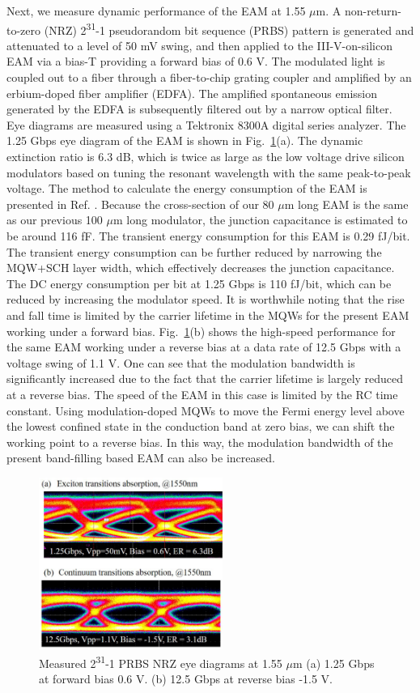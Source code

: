 \documentclass[aip,apl,preprint,a4paper]{revtex4-1}
\def\SP#1{\textsuperscript{#1}}
\begin{document}
Next, we measure dynamic performance of the EAM at 1.55 $\mu$m. A non-return-to-zero (NRZ)  2\SP{31}-1 pseudorandom bit sequence (PRBS) pattern is generated and  attenuated  to  a  level  of  50 mV  swing,  and then  applied  to  the III-V-on-silicon EAM via a bias-T providing a forward bias of 0.6 V. The modulated light is coupled out to a fiber through a fiber-to-chip grating coupler and amplified by an erbium-doped fiber amplifier (EDFA). The amplified spontaneous emission generated by the EDFA is subsequently filtered out by a narrow optical filter. Eye diagrams are measured using a Tektronix 8300A digital series analyzer. The 1.25 Gbps eye diagram of the EAM is shown in Fig.~\ref{fig:6}(a). The dynamic extinction ratio is 6.3 dB, which is twice as large as the low voltage drive silicon modulators based on tuning the resonant wavelength with the same peak-to-peak voltage.\cite{Shakoor:14} The method to calculate the energy consumption of the EAM is presented in Ref. . Because the cross-section of our 80 $\mu$m long EAM is the same as our previous 100 $\mu$m long modulator,\cite{fu52015} the junction capacitance is estimated to be around 116 fF. The transient energy consumption for this EAM is 0.29 fJ/bit. The transient energy consumption can be further reduced by narrowing the MQW+SCH layer width, which effectively decreases the junction capacitance. The DC energy consumption per bit at 1.25 Gbps is 110 fJ/bit, which can be reduced by increasing the modulator speed. It is worthwhile noting that the rise and fall time is limited by the carrier lifetime in the MQWs for the present EAM working under a forward bias. Fig.~\ref{fig:6}(b) shows the high-speed performance for the same EAM working under a reverse bias at a data rate of 12.5 Gbps with a voltage swing of 1.1 V. One can see that the modulation bandwidth is significantly increased due to the fact that the carrier lifetime is largely reduced at a reverse bias. The speed of the EAM in this case is limited by the RC time constant.\cite{Yong40,fu52015} Using modulation-doped MQWs to move the Fermi energy level above the lowest confined state in the conduction band at zero bias, we can shift the working point to a reverse bias.\cite{livescu1988free,kalinovsky1993free} In this way, the modulation bandwidth of the present band-filling based EAM can also be increased.

\begin{figure}
	\includegraphics[width=6cm]{figure/fig6.eps}%
	\caption{\label{fig:6} Measured 2\SP{31}-1 PRBS NRZ eye diagrams at 1.55 $\mu$m (a) 1.25 Gbps at forward bias 0.6 V.  (b) 12.5 Gbps at reverse bias -1.5 V.}
\end{figure}
\end{document}
